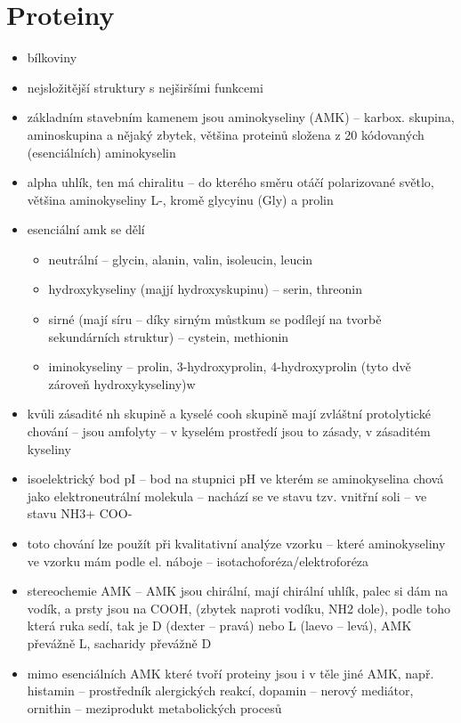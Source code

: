 \documentclass{article}
\begin{document}
\section{Proteiny}
\begin{itemize}
  \item bílkoviny
  \item nejsložitější struktury s nejširšími funkcemi
  \item základním stavebním kamenem jsou aminokyseliny (AMK) -- karbox. skupina, aminoskupina a nějaký zbytek, většina proteinů složena z 20 kódovaných (esenciálních) aminokyselin
  \item alpha uhlík, ten má chiralitu -- do kterého směru otáčí polarizované světlo, většina aminokyseliny L-, kromě glycyinu (Gly) a prolin
  \item esenciální amk se dělí
  \begin{itemize}
    \item neutrální -- glycin, alanin, valin, isoleucin, leucin
    \item hydroxykyseliny (majjí hydroxyskupinu) -- serin, threonin
    \item sirné (mají síru -- díky sirným můstkum se podílejí na tvorbě sekundárních struktur) -- cystein, methionin
    \item iminokyseliny -- prolin, 3-hydroxyprolin, 4-hydroxyprolin (tyto dvě zároveň hydroxykyseliny)w
  \end{itemize}
  \item kvůli zásadité nh skupině a kyselé cooh skupině mají zvláštní protolytické chování -- jsou amfolyty -- v kyselém prostředí jsou to zásady, v zásaditém kyseliny
  \item isoelektrický bod pI -- bod na stupnici pH ve kterém se aminokyselina chová jako elektroneutrální molekula -- nachází se ve stavu tzv. vnitřní soli -- ve stavu NH3+ COO-
  \item toto chování lze použít při kvalitativní analýze vzorku -- které aminokyseliny ve vzorku mám podle el. náboje -- isotachoforéza/elektroforéza
  \item stereochemie AMK -- AMK jsou chirální, mají chirální uhlík, palec si dám na vodík, a prsty jsou na COOH, (zbytek naproti vodíku, NH2 dole), podle toho která ruka sedí, tak je D (dexter -- pravá) nebo L (laevo -- levá), AMK převážně L, sacharidy převážně D
  \item mimo esenciálních AMK které tvoří proteiny jsou i v těle jiné AMK, např. histamin -- prostředník alergických reakcí, dopamin -- nerový mediátor, ornithin -- meziprodukt metabolických procesů

\end{itemize}
\end{document}
